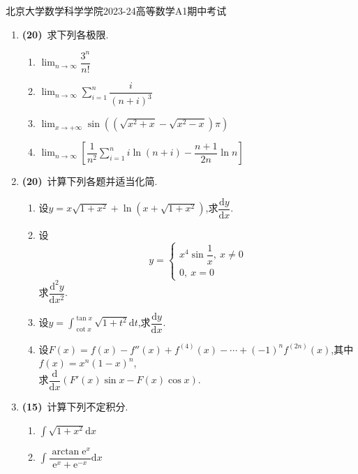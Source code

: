\documentclass{ctexart}
\newcommand{\e}{\mathrm{e}}
\newcommand{\di}{\mathrm{d}}
\newcommand{\dx}{\di x}
\begin{document}
\pagestyle{empty}
\begin{center}\Large
    北京大学数学科学学院2023-24高等数学A1期中考试
\end{center}
\begin{enumerate}[leftmargin=*,label=\textbf{\arabic*.}]
    \item \textbf{(20)}\ 求下列各极限.
        \begin{enumerate}[label=\textbf{(\arabic*)}]
            \item $\displaystyle\lim_{n\to\infty}{\dfrac{3^n}{n!}}$
            \item $\displaystyle\lim_{n\to\infty}{\sum_{i=1}^{n}{\dfrac{i}{(n+i)^3}}}$
            \item $\displaystyle\lim_{x\to+\infty}{\sin\left(\left(\sqrt{x^2+x}-\sqrt{x^2-x}\right)\pi\right)}$
            \item $\displaystyle\lim_{n\to\infty}\left[\dfrac{1}{n^2}\sum_{i=1}^{n}i\ln(n+i)-\dfrac{n+1}{2n}\ln{n}\right]$
        \end{enumerate}
    \item \textbf{(20)}\ 计算下列各题并适当化简.
        \begin{enumerate}[label=\textbf{(\arabic*)}]
            \item 设$y=x\sqrt{1+x^2}+\ln{\left(x+\sqrt{1+x^2}\right)}$,求$\dfrac{\di y}{\dx}$.
            \item 设
                $$y=\left\{
                    \begin{array}{l}
                        x^4\sin{\dfrac{1}{x}},\ x\neq 0 \\
                        0,\ x=0
                    \end{array}
                    \right.$$
                求$\dfrac{\di^2 y}{\dx^2}$.
            \item 设$\displaystyle y=\int_{\cot x}^{\tan x}\sqrt{1+t^2}\di t$,求$\dfrac{\di y}{\dx}$.
            \item 设$F(x)=f(x)-f''(x)+f^{(4)}(x)-\cdots+(-1)^{n}f^{(2n)}(x)$,其中$f(x)=x^n(1-x)^n$,
                \\求$\dfrac{\di}{\dx}\left(F'(x)\sin x-F(x)\cos x\right)$.
        \end{enumerate}
    \item \textbf{(15)}\ 计算下列不定积分.
        \begin{enumerate}[label=\textbf{(\arabic*)}]
            \item $\displaystyle\int\sqrt{1+x^2}\dx$
            \item $\displaystyle\int\dfrac{\arctan \e^x}{\e^x+\e^{-x}}\dx$

\end{enumerate}
\end{enumerate}
\end{document}
